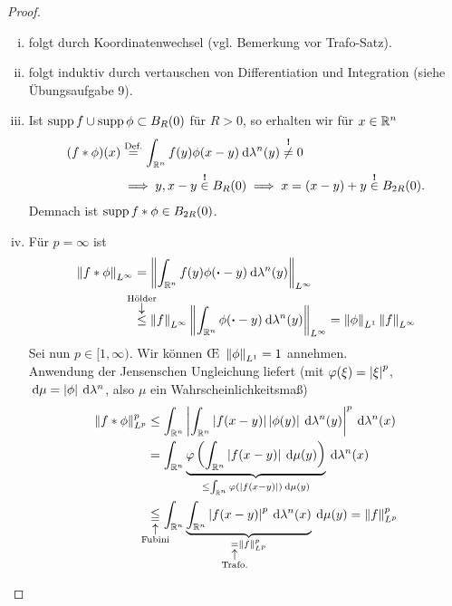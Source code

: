 \documentclass[skript.tex]{subfiles}
\begin{document}
	\begin{proof}
		\hfill
		\begin{enumerate}[(i)]
			\item folgt durch Koordinatenwechsel (vgl. Bemerkung vor Trafo-Satz).
			
			\item folgt induktiv durch vertauschen von Differentiation und Integration (siehe Übungsaufgabe 9).
			
			\item Ist $\operatorname{supp} f \cup \operatorname{supp} \phi \subset B_R(0)$ für $R > 0$, so erhalten wir für $x \in \mathbb{R}^n$
			\begin{align*}
				(f \ast \phi)(x) &\overset{\text{Def.}}{=} \int_{\mathbb{R}^n} f(y)\phi(x-y)\: \mathrm{d}\lambda^n(y) \overset{\boldsymbol !}{\neq} 0 \\
				&\implies y,x-y \overset{\boldsymbol !}{\in} B_R(0) \implies x = (x-y)+y \overset{\boldsymbol !}{\in} B_{2R}(0).
			\end{align*}
			Demnach ist $\operatorname{supp} f\ast\phi \in B_{2R}(0)$.
			
			\item Für $p=\infty$ ist
			\begin{align*}
				\norm{f\ast\phi}_{L^\infty} &= \norm{\int_{\mbb{R}^n} f(y) \phi(\bcdot-y) \md\lambda^n(y)}_{L^\infty} \\ &\darrow{\text{Hölder}}{\leq} \norm{f}_{L^\infty} \norm{\int_{\mbb{R}^n}\phi(\bcdot-y) \md\lambda^n(y)}_{L^\infty} = \norm{\phi}_{L^1}\norm{f}_{L^\infty}
			\end{align*}
			Sei nun $p \in [1,\infty)$. Wir können \OE\  $\left\lVert \phi \right\rVert_{L^1} = 1$ annehmen.\\
			Anwendung der Jensenschen Ungleichung liefert (mit $\varphi(\xi) = \left| \xi \right|^p$, $\: \mathrm{d}\mu=\left| \phi \right|\: \mathrm{d}\lambda^n$, also $\mu$ ein Wahrscheinlichkeitsmaß)
			\begin{align*}
				\norm{f\ast\phi}_{L^p}^p &\leq \int_{\mbb{R}^n}\abs{\int_{\mbb{R}^n} \abs{f(x-y)} \abs{\phi(y)} \md\lambda^n(y)}^p \md \lambda^n(x)
				\\ 
				&= \int_{\mbb{R}^n} \underbrace{\varphi\left(\int_{\mbb{R}^n} \abs{f(x-y)} \md\mu(y)\right)}_{
					\mathclap{
						\leq \int_{\mbb{R}^n} 	\varphi(\abs{f(x-y)}) \md\mu(y)
					}
				} \md \lambda^n(x) \\
				&\uarrow{\text{Fubini}}{\leqq} \int_{\mbb{R}^n}\underbrace{\int_{\mbb{R}^n} \abs{f(x-y)}^p \md\lambda^n(x)}_{\uarrow{\text{Trafo.}}{=} \norm{f}_{L^p}^p} \md\mu(y) = \norm{f}_{L^p}^p
			\end{align*}
		\end{enumerate}
	\end{proof}
	
\end{document}
